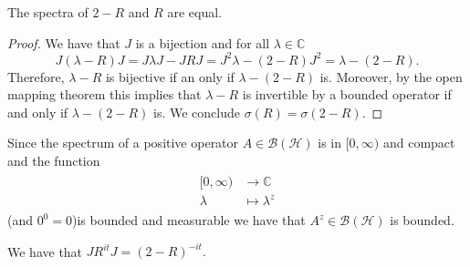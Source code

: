 \begin{theorem}
The spectra of $2-R$ and $R$ are equal.
\end{theorem}

\begin{proof}
We have that $J$ is a bijection and for all $\lambda\in\mathbb{C}$
\begin{equation}
J(\lambda-R)J=J\lambda J-JRJ=J^2\lambda-(2-R)J^2=\lambda-(2-R).
\end{equation}
Therefore, $\lambda-R$ is bijective if an only if $\lambda-(2-R)$ is. Moreover, by the open mapping theorem this implies that $\lambda-R$ is invertible by a bounded operator if and only if $\lambda-(2-R)$ is. We conclude $\sigma(R)=\sigma(2-R)$. 
\end{proof}

Since the spectrum of a positive operator $A\in\mathcal{B}(\mathcal{H})$ is in $[0,\infty)$ and compact and the function
\begin{align}
\begin{split}
[0,\infty)&\rightarrow \mathbb{C} \\
\lambda&\mapsto\lambda^z
\end{split}
\end{align}
(and $0^0=0$)is bounded and measurable we have that $A^z\in\mathcal{B}(\mathcal{H})$ is bounded. 

\begin{theorem}
We have that $JR^{it}J=(2-R)^{-it}.$
\end{theorem}

